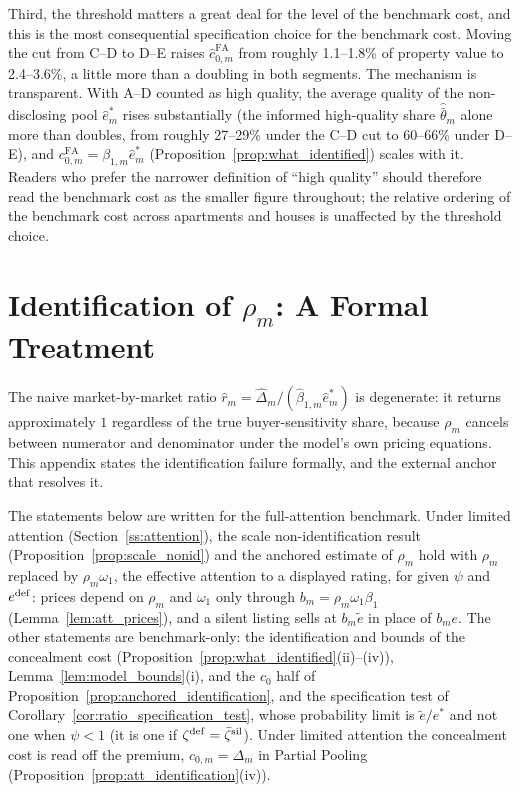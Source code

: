 Third, the threshold matters a great deal for the level of the benchmark cost, and this is
the most consequential specification choice for the benchmark cost. Moving the cut from C--D to D--E raises
$\hat c^{\mathrm{FA}}_{0,m}$ from roughly 1.1--1.8\% of property value to 2.4--3.6\%, a little more than a
doubling in both segments. The mechanism is transparent. With A--D counted as high quality,
the average quality of the non-disclosing pool $\hat e^*_m$ rises substantially (the informed
high-quality share $\hat{\bar\theta}_m$ alone more than doubles, from roughly 27--29\% under
the C--D cut to 60--66\% under D--E), and $c^{\mathrm{FA}}_{0,m}=\beta_{1,m}\hat e^*_m$
(Proposition~\ref{prop:what_identified}) scales with it. Readers who prefer the narrower
definition of ``high quality'' should therefore read the benchmark cost as the smaller
figure throughout; the relative ordering of the benchmark cost across apartments and houses
is unaffected by the threshold choice.


\section{Identification of $\rho_m$: A Formal Treatment}
\label{app:rho_identification}

The naive market-by-market ratio $\hat r_m=\hat\Delta_m/(\hat\beta_{1,m}\hat e^*_m)$ is
degenerate: it returns approximately $1$ regardless of the true buyer-sensitivity share, because
$\rho_m$ cancels between numerator and denominator under the model's own pricing equations. This
appendix states the identification failure formally, and the external anchor that resolves it.

The statements below are written for the full-attention benchmark. Under limited attention (Section~\ref{ss:attention}), the scale non-identification result (Proposition~\ref{prop:scale_nonid}) and the anchored estimate of $\rho_m$ hold with $\rho_m$ replaced by $\rho_m\omega_1$, the effective attention to a displayed rating, for given $\psi$ and $e^{\rm def}$: prices depend on $\rho_m$ and $\omega_1$ only through $b_m=\rho_m\omega_1\beta_1$ (Lemma~\ref{lem:att_prices}), and a silent listing sells at $b_m\tilde e$ in place of $b_m e$. The other statements are benchmark-only: the identification and bounds of the concealment cost (Proposition~\ref{prop:what_identified}(ii)--(iv)), Lemma~\ref{lem:model_bounds}(i), and the $c_0$ half of Proposition~\ref{prop:anchored_identification}, and the specification test of Corollary~\ref{cor:ratio_specification_test}, whose probability limit is $\tilde e/e^*$ and not one when $\psi<1$ (it is one if $\zeta^{\rm def}=\bar \zeta^{\rm sil}$). Under limited attention the concealment cost is read off the premium, $c_{0,m}=\Delta_m$ in Partial Pooling (Proposition~\ref{prop:att_identification}(iv)).


